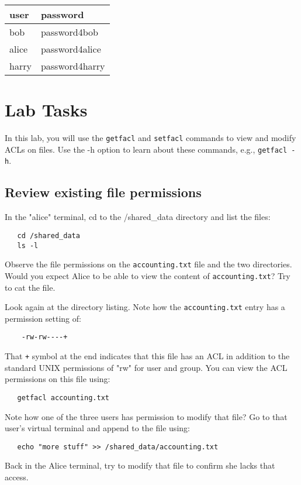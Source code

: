 \medskip
{\begin{tabular}{ l | l  }

 \hline
 user & password \\ \hline
 bob & password4bob \\
 alice & password4alice \\
 harry & password4harry \\
\end{tabular}

\section{Lab Tasks}
In this lab, you will use the {\tt getfacl} and {\tt setfacl} commands to 
view and modify ACLs on files. Use the -h option to learn about these
commands, e.g., {\tt getfacl -h}.

\subsection{Review existing file permissions}
In the "alice" terminal, cd to the /shared\_data directory and list
the files:
\begin{verbatim}
   cd /shared_data
   ls -l
\end{verbatim}
\noindent
Observe the file permissions on the {\tt accounting.txt} file and the two
directories.  Would you expect Alice to be able to view the content of
{\tt accounting.txt}?  Try to cat the file.

Look again at the directory listing.  Note how the {\tt accounting.txt}
entry has a permission setting of:
\begin{verbatim}
    -rw-rw----+
\end{verbatim}
That {\tt +} symbol at the end indicates that this file has an ACL in addition
to the standard UNIX permissions of "rw" for user and group.  You can view the
ACL permissions on this file using:
\begin{verbatim}
   getfacl accounting.txt
\end{verbatim}

Note how one of the three users has permission to modify that file?  Go to that
user's virtual terminal and append to the file using:
\begin{verbatim}
   echo "more stuff" >> /shared_data/accounting.txt
\end{verbatim}

Back in the Alice terminal, try to modify that file to confirm she lacks that access.


}

